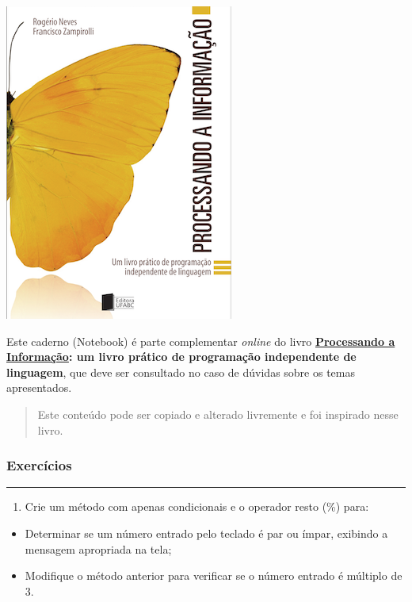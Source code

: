 \documentclass[12pt,a4paper]{article}
\providecommand{\tightlist}{%
      \setlength{\itemsep}{0pt}\setlength{\parskip}{0pt}}
\begin{document}
    \includegraphics{"figs/Capa_Processando_Informacao.jpg"}

Este caderno (Notebook) é parte complementar \emph{online} do livro
\textbf{\href{https://editora.ufabc.edu.br/matematica-e-ciencias-da-computacao/58-processando-a-informacao}{Processando
a Informação}: um livro prático de programação independente de
linguagem}, que deve ser consultado no caso de dúvidas sobre os temas
apresentados.

\begin{quote}
Este conteúdo pode ser copiado e alterado livremente e foi inspirado
nesse livro.
\end{quote}

    \hypertarget{exercuxedcios}{%
\subsubsection{Exercícios}\label{exercuxedcios}}

    \begin{center}\rule{0.5\linewidth}{0.5pt}\end{center}

\begin{enumerate}
\def\labelenumi{\arabic{enumi}.}
\tightlist
\item
  Crie um método com apenas condicionais e o operador resto (\%) para:
\end{enumerate}

\begin{itemize}
\tightlist
\item
  Determinar se um número entrado pelo teclado é par ou ímpar, exibindo
  a mensagem apropriada na tela;\\
\item
  Modifique o método anterior para verificar se o número entrado é
  múltiplo de 3.
\end{itemize}
\end{document}
